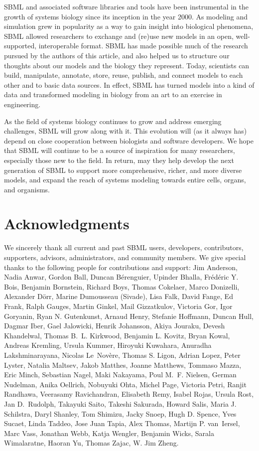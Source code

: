 \documentclass{sbml-paper}
\begin{document}
SBML and associated software libraries and tools have been instrumental in the growth of systems biology %
since its inception in the year 2000.
As modeling and simulation grew in popularity as a way to gain insight into biological phenomena, SBML allowed researchers to exchange and (re)use new models in an open, well-supported, interoperable format. SBML has made possible much of the research pursued by the authors of this article, and also helped us to structure our thoughts about our models and the biology they represent.  Today, scientists can build, manipulate, annotate, store, reuse, publish, and connect models to each other and to basic data sources.  In effect, SBML has turned models into a kind of data and transformed modeling in biology from an art to an exercise in engineering.

As the field of systems biology continues to grow and address emerging challenges, SBML will grow along with it.  This evolution will (as it always has) depend on close cooperation between biologists and software developers.  We hope that SBML will continue to be a source of inspiration for many researchers, especially those new to the field.  In return, may they help develop the next generation of SBML to support more comprehensive, richer, and more diverse models, and expand the reach of systems modeling towards entire cells, organs, and organisms.


\section*{Acknowledgments}

We sincerely thank all current and past SBML users, developers, contributors, supporters, advisors, administrators, and community members.  We give special thanks to the following people for contributions and support:
Jim Anderson,
Nadia Anwar,
Gordon Ball,
Duncan B\'{e}renguier,
Upinder Bhalla,
Fr\'{e}d\'{e}ric Y. Bois,
Benjamin Bornstein,
Richard Boys,
Thomas Cokelaer,
Marco Donizelli,
Alexander D\"{o}rr,
Marine Dumousseau (Sivade),
Lisa Falk,
David Fange,
Ed Frank,
Ralph Gauges,
Martin Ginkel,
Mail Gizzatkulov,
Victoria Gor,
Igor Goryanin,
Ryan N. Gutenkunst,
Arnaud Henry,
Stefanie Hoffmann,
Duncan Hull,
Dagmar Iber,
Gael Jalowicki,
Henrik Johansson,
Akiya Jouraku,
Devesh Khandelwal,
Thomas B.~L. Kirkwood,
Benjamin L. Kovitz,
Bryan Kowal,
Andreas Kremling,
Ursula Kummer,
Hiroyuki Kuwahara,
Anuradha Lakshminarayana,
Nicolas Le~Nov\`{e}re,
Thomas S. Ligon,
Adrian Lopez,
Peter Lyster,
Natalia Maltsev,
Jakob Matthes,
Joanne Matthews,
Tommaso Mazza,
Eric Minch,
Sebastian Nagel,
Maki Nakayama,
Poul M.~F. Nielsen,
German Nudelman,
Anika Oellrich,
Nobuyuki Ohta,
Michel Page,
Victoria Petri,
Ranjit Randhawa,
Veerasamy Ravichandran,
Elisabeth Remy,
Isabel Rojas,
Ursula Rost,
Jan D.~Rudolph,
Takayuki Saito,
Takeshi Sakurada,
Howard Salis,
Maria J. Schilstra,
Daryl Shanley,
Tom Shimizu,
Jacky Snoep,
Hugh D. Spence,
Yves Sucaet,
Linda Taddeo,
Jose Juan Tapia,
Alex Thomas,
Martijn P. van~Iersel,
Marc Vass,
Jonathan Webb,
Katja Wengler,
Benjamin Wicks,
Sarala Wimalaratne,
Haoran Yu,
Thomas Zajac,
W. Jim Zheng.
\end{document}

